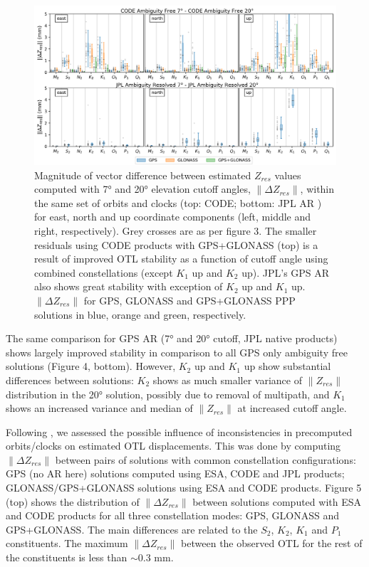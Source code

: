 \documentclass[se, manuscript]{copernicus}
\begin{document}
\begin{figure}[t]
\includegraphics[width=17cm]{fig04.png}
\caption{Magnitude of vector difference between estimated $Z_{res}$ values computed with 7° and 20° elevation cutoff angles, $\|\Delta Z_{res}\|$, within the same set of orbits and clocks (top: CODE; bottom: JPL AR ) for east, north and up coordinate components (left, middle and right, respectively). Grey crosses are as per figure 3. The smaller residuals using CODE products with GPS+GLONASS (top) is a result of improved OTL stability as a function of cutoff angle using combined constellations (except $K_1$ up and $K_2$ up). JPL’s GPS AR also shows great stability with exception of $K_2$ up and $K_1$ up. $\|\Delta Z_{res}\|$ for GPS, GLONASS and GPS+GLONASS PPP solutions in blue, orange and green, respectively.}
\end{figure}

The same comparison for GPS AR (7° and 20° cutoff, JPL native products) shows largely improved stability in comparison to all GPS only ambiguity free solutions (Figure 4, bottom). However, $K_2$ up and $K_1$ up show substantial differences between solutions: $K_2$ shows as much smaller variance of $\|Z_{res}\|$ distribution in the 20° solution, possibly due to removal of multipath, and $K_1$ shows an increased variance and median of $\|Z_{res}\|$ at increased cutoff angle. 

Following \cite{Yuan2013}, we assessed the possible influence of inconsistencies in precomputed orbits/clocks on estimated OTL displacements. This was done by computing $\|\Delta Z_{res}\|$ between pairs of solutions with common constellation configurations: GPS (no AR here) solutions computed using ESA, CODE and JPL products; GLONASS/GPS+GLONASS solutions using ESA and CODE products. Figure 5 (top) shows the distribution of $\|\Delta Z_{res}\|$ between solutions computed with ESA and CODE products for all three constellation modes: GPS, GLONASS and GPS+GLONASS. The main differences are related to the $S_2$, $K_2$, $K_1$ and $P_1$ constituents. The maximum $\|\Delta Z_{res}\|$ between the observed OTL for the rest of the constituents is less than $\sim$0.3 mm.
\end{document}

